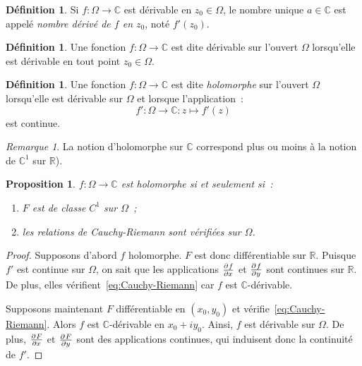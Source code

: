 \documentclass{report}
\newtheorem{prp}[thm]{Proposition}
\theoremstyle{definition}
\newtheorem{déf}[thm]{Définition}
\theoremstyle{remark}
\newtheorem*{rmq}{Remarque}
\numberwithin{equation}{section}
\newcommand{\C}{\mathbb C}
\newcommand{\R}{\mathbb R}
\begin{document}
			\begin{déf} Si $f : \Omega \to \C$ est dérivable en $z_0 \in \Omega$, le nombre unique $a \in \C$ est appelé \textit{nombre dérivé de $f$ en $z_0$}, noté $f'(z_0)$.
			\end{déf}

			\begin{déf} Une fonction $f : \Omega \to \C$ est dite dérivable sur l'ouvert $\Omega$ lorsqu'elle est dérivable en tout point $z_0 \in \Omega$.
			\end{déf}

			\begin{déf} Une fonction $f : \Omega \to \C$ est dite \textit{holomorphe} sur l'ouvert $\Omega$ lorsqu'elle est dérivable sur $\Omega$ et lorsque l'application~:
			\begin{equation}
				f' : \Omega \to \C : z \mapsto f'(z)
			\end{equation}
			est continue.
			\end{déf}

			\begin{rmq} La notion d'holomorphe sur $\C$ correspond plus ou moins à la notion de $\C^1$ sur $\R$).
			\end{rmq}

			\begin{prp} $f : \Omega \to \C$ est holomorphe si et seulement si~:
			\begin{enumerate}
				\item $F$ est de classe $C^1$ sur $\Omega$~;
				\item les relations de Cauchy-Riemann sont vérifiées sur $\Omega$.
			\end{enumerate}
			\end{prp}

			\begin{proof} Supposons d'abord $f$ holomorphe. $F$ est donc différentiable sur $\R$. Puisque $f'$ est continue sur $\Omega$, on sait que les applications
			$\pd fx$ et $\pd fy$ sont continues sur $\R$. De plus, elles vérifient~\eqref{eq:Cauchy-Riemann} car $f$ est $\C$-dérivable.

			Supposons maintenant $F$ différentiable en $(x_0, y_0)$ et vérifie~\eqref{eq:Cauchy-Riemann}. Alors $f$ est $\C$-dérivable en $x_0 + iy_0$. Ainsi, $f$
			est dérivable sur $\Omega$. De plus, $\pd Fx$ et $\pd Fy$ sont des applications continues, qui induisent donc la continuité de $f'$.
			\end{proof}
\end{document}
